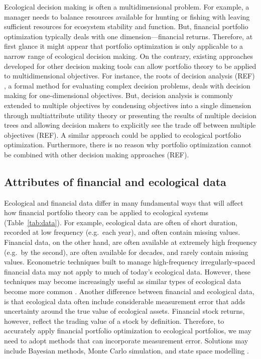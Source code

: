 Ecological decision making is often a multidimensional problem. For example, a manager needs to balance resources available for hunting or fishing with leaving sufficient resources for ecosystem stability and function. But, financial portfolio optimization typically deals with one dimension---financial returns. Therefore, at first glance it might appear that portfolio optimization is only applicable to a narrow range of ecological decision making. On the contrary, existing approaches developed for other decision making tools can allow portfolio theory to be applied to multidimensional objectives. For instance, the roots of decision analysis (REF) \citep{keeney1976, keeney1982}, a formal method for evaluating complex decision problems, deals with decision making for one-dimensional objectives. But, decision analysis is commonly extended to multiple objectives by condensing objectives into a single dimension through multiattribute utility theory \citep{keeney1976} or presenting the results of multiple decision trees and allowing decision makers to explicitly see the trade off between multiple objectives (REF). A similar approach could be applied to ecological portfolio optimization. Furthermore, there is no reason why portfolio optimization cannot be combined with other decision making approaches (REF).

\subsection{Attributes of financial and ecological data}\label{attributes-of-financial-and-ecological-data}

Ecological and financial data differ in many fundamental ways that will affect how financial portfolio theory can be applied to ecological systems (Table~\ref{tab:data}). For example, ecological data are often of short duration, recorded at low frequency (e.g.~each year), and often contain missing values. Financial data, on the other hand, are often available at extremely high frequency (e.g.~by the second), are often available for decades, and rarely contain missing values. Econometric techniques built to manage high-frequency irregularly-spaced financial data \citep[e.g.][]{hautsch2012} may not apply to much of today's ecological data. However, these techniques may become increasingly useful as similar types of ecological data become more common \citep[e.g.~the Ocean Tracking Network,][]{cooke2011}. Another difference between financial and ecological data, is that ecological data often include considerable measurement error that adds uncertainty around the true value of ecological assets. Financial stock returns, however, reflect the trading value of a stock by definition. Therefore, to accurately apply financial portfolio optimization to ecological portfolios, we may need to adopt methods that can incorporate measurement error. Solutions may include Bayesian methods, Monte Carlo simulation, and state space modelling \citep{morgan1990}.

